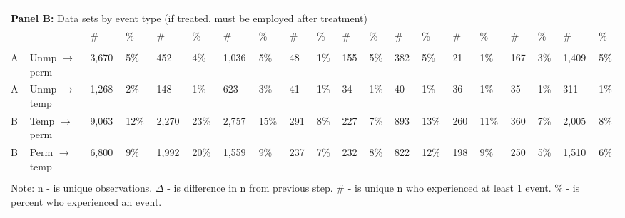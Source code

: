 \begin{tabular}{l>{\raggedright\arraybackslash}p{2.5in}llllllllllllllllll}
\hline \\[-1.8ex]  
 
\multicolumn{14}{l}{{\bf Panel B:} Data sets by event type (if treated, must be employed after treatment)} \\ 

& 
& \# & \%
& \# & \%
& \# & \%
& \# & \%
& \# & \%
& \# & \%
& \# & \%
& \# & \%
& \# & \%
\\ 
\cmidrule(lr){1-2}
\cmidrule(lr){3-4}
\cmidrule(lr){5-6}
\cmidrule(lr){7-8}
\cmidrule(lr){9-10}
\cmidrule(lr){11-12}
\cmidrule(lr){13-14}
\cmidrule(lr){15-16}
\cmidrule(lr){17-18}
\cmidrule(lr){19-20}
\\[-1.8ex]  
 
A & Unmp $\rightarrow$ perm & 3,670 & 5\% & 452 & 4\% & 1,036 & 5\% & 48 & 1\% & 155 & 5\% & 382 & 5\% & 21 & 1\% & 167 & 3\% & 1,409 & 5\% \\ 
  A & Unmp $\rightarrow$ temp & 1,268 & 2\% & 148 & 1\% & 623 & 3\% & 41 & 1\% & 34 & 1\% & 40 & 1\% & 36 & 1\% & 35 & 1\% & 311 & 1\% \\ 
  B & Temp $\rightarrow$ perm & 9,063 & 12\% & 2,270 & 23\% & 2,757 & 15\% & 291 & 8\% & 227 & 7\% & 893 & 13\% & 260 & 11\% & 360 & 7\% & 2,005 & 8\% \\ 
  B & Perm $\rightarrow$ temp & 6,800 & 9\% & 1,992 & 20\% & 1,559 & 9\% & 237 & 7\% & 232 & 8\% & 822 & 12\% & 198 & 9\% & 250 & 5\% & 1,510 & 6\% \\ 
   \bottomrule \\[-1.8ex] \multicolumn{20}{p{12in}}{Note: n - is unique observations.  $\Delta$ - is difference in n from previous step.  \# - is unique n who experienced at least 1 event.  \% - is percent who experienced an event.} 
\end{tabular}
